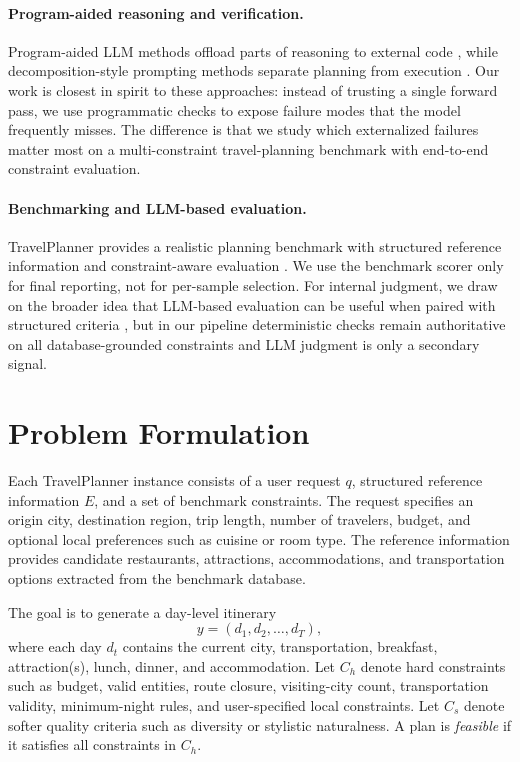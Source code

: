 \documentclass{article}
\begin{document}
\paragraph{Program-aided reasoning and verification.}
Program-aided LLM methods offload parts of reasoning to external code \citep{gao2022pal}, while decomposition-style prompting methods separate planning from execution \citep{wang2023planandsolve,wang2022selfconsistency}. Our work is closest in spirit to these approaches: instead of trusting a single forward pass, we use programmatic checks to expose failure modes that the model frequently misses. The difference is that we study which externalized failures matter most on a multi-constraint travel-planning benchmark with end-to-end constraint evaluation.

\paragraph{Benchmarking and LLM-based evaluation.}
TravelPlanner provides a realistic planning benchmark with structured reference information and constraint-aware evaluation \citep{xie2024travelplanner}. We use the benchmark scorer only for final reporting, not for per-sample selection. For internal judgment, we draw on the broader idea that LLM-based evaluation can be useful when paired with structured criteria \citep{liu2023geval}, but in our pipeline deterministic checks remain authoritative on all database-grounded constraints and LLM judgment is only a secondary signal.

\section{Problem Formulation}
Each TravelPlanner instance consists of a user request $q$, structured reference information $E$, and a set of benchmark constraints. The request specifies an origin city, destination region, trip length, number of travelers, budget, and optional local preferences such as cuisine or room type. The reference information provides candidate restaurants, attractions, accommodations, and transportation options extracted from the benchmark database.

The goal is to generate a day-level itinerary
\[
y = (d_1, d_2, \dots, d_T),
\]
where each day $d_t$ contains the current city, transportation, breakfast, attraction(s), lunch, dinner, and accommodation. Let $C_h$ denote hard constraints such as budget, valid entities, route closure, visiting-city count, transportation validity, minimum-night rules, and user-specified local constraints. Let $C_s$ denote softer quality criteria such as diversity or stylistic naturalness. A plan is \emph{feasible} if it satisfies all constraints in $C_h$.
\end{document}
